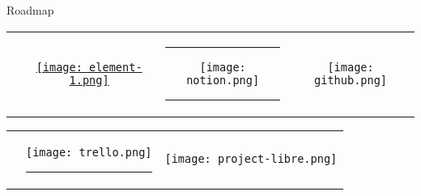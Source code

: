 \begin{frame}[c]{Roadmap}
    \begin{tabular}{cccc}
        \rule{30pt}{0ex}  &   \href{https://element.io/}{\texttt{[image: element-1.png]}} & \rule{15pt}{0ex} \texttt{[image: notion.png]} \rule{15pt}{0ex}& \texttt{[image: github.png]}\\
    \end{tabular}

    \begin{tabular}{ccc}
        \phantom{This text s invisible} &   \texttt{[image: trello.png]} \rule{5pt}{0ex}& \texttt{[image: project-libre.png]} \\
    \end{tabular}
\end{frame}



